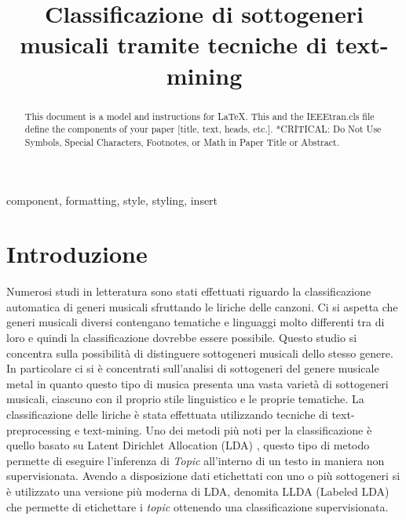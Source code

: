 \documentclass[technote]{IEEEtran}
\begin{document}
\title{Classificazione di sottogeneri musicali tramite tecniche di text-mining}

\author{
\and
{}
\and
{}
}
\maketitle

\begin{abstract}
This document is a model and instructions for \LaTeX.
This and the IEEEtran.cls file define the components of your paper [title, text, heads, etc.]. *CRITICAL: Do Not Use Symbols, Special Characters, Footnotes, 
or Math in Paper Title or Abstract.
\end{abstract}

\begin{IEEEkeywords}
component, formatting, style, styling, insert
\end{IEEEkeywords}

\section{Introduzione}
Numerosi studi in letteratura sono stati effettuati riguardo la classificazione
automatica di generi musicali sfruttando le liriche delle canzoni. Ci si aspetta
che generi musicali diversi contengano tematiche e linguaggi molto differenti
tra di loro e quindi la classificazione dovrebbe essere possibile.
Questo studio si concentra sulla possibilità di distinguere sottogeneri musicali
dello stesso genere.
In particolare ci si è concentrati sull'analisi di sottogeneri del genere musicale
metal in quanto questo tipo di musica presenta una vasta varietà di sottogeneri
musicali, ciascuno con il proprio stile linguistico e le proprie tematiche.
La classificazione delle liriche è stata effettuata utilizzando tecniche di
text-preprocessing e text-mining.
Uno dei metodi più noti per la classificazione è quello basato su
Latent Dirichlet Allocation (LDA) \cite{LDA}, questo tipo di metodo permette di eseguire l'inferenza di \textit{Topic} all'interno di un testo in maniera non supervisionata.
Avendo a disposizione dati etichettati con uno o più sottogeneri si è utilizzato una versione più moderna di LDA, denomita LLDA (Labeled LDA) \cite{ramage-etal-2009-labeled} che permette di etichettare i \textit{topic} ottenendo una classificazione supervisionata.  
\end{document}
